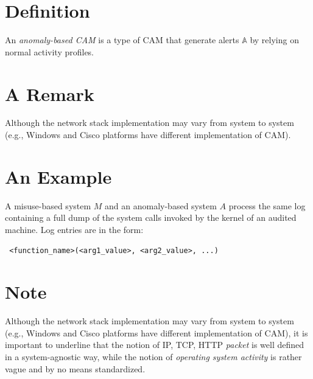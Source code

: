 
\section{Definition}

\begin{definition}
An \emph{anomaly-based \ac{CAM}} is a type of \ac{CAM} that generate alerts $\mathbb{A}$ by relying on normal activity profiles.
\end{definition}


\section{A Remark}

\begin{rem}
Although the network stack implementation may vary from system to system (e.g., \textsf{Windows} and \textsf{Cisco} platforms have different implementation of \ac{CAM}).
\end{rem}


\section{An Example}

\begin{example}\label{ex:misuse-vs-anomaly}
A misuse-based system $M$ and an anomaly-based system $A$ process the same log containing a full dump of the system calls invoked by the kernel of an audited machine. Log entries are in the form:

\begin{center}\small
\begin{verbatim} <function_name>(<arg1_value>, <arg2_value>, ...)
\end{verbatim}
\end{center}
\end{example}


\section{Note}

\begin{note}\label{note:network-stack-standardized}
Although the network stack implementation may vary from system to system (e.g., \textsf{Windows} and \textsf{Cisco} platforms have different implementation of \ac{CAM}), it is important to underline that the notion of IP, TCP, HTTP \emph{packet} is well defined in a system-agnostic way, while the notion of \emph{operating system activity} is rather vague and by no means standardized.
\end{note}
